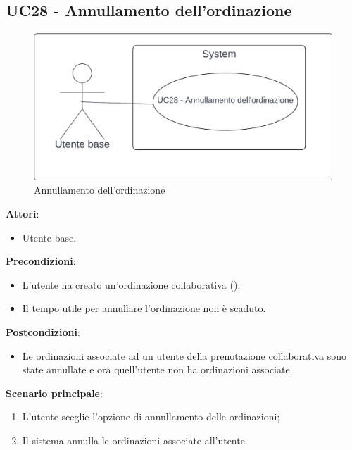 \subsection{UC28 - Annullamento dell'ordinazione}\label{usecase:28}
\begin{figure}[H]
    \centering
    \includegraphics[width=0.9\linewidth]{ucd/UCD28.png}
    \caption{Annullamento dell'ordinazione}
\end{figure}
\textbf{Attori}:
\begin{itemize}
    \item Utente base.
\end{itemize}
\textbf{Precondizioni}:
\begin{itemize}
    \item L'utente ha creato un'ordinazione collaborativa ();
    \item Il tempo utile per annullare l'ordinazione non è scaduto.
\end{itemize}
\textbf{Postcondizioni}:
\begin{itemize}
    \item Le ordinazioni associate ad un utente della prenotazione collaborativa sono state annullate e ora quell'utente non ha ordinazioni associate.
\end{itemize}
\textbf{Scenario principale}:
\begin{enumerate}
    \item L'utente sceglie l'opzione di annullamento delle ordinazioni;
    \item Il sistema annulla le ordinazioni associate all'utente.
\end{enumerate}
\newpage